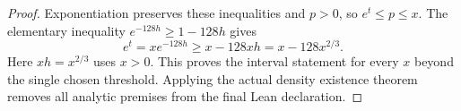 \begin{proof}
Exponentiation preserves these inequalities and $p>0$, so
$e^t\leq p\leq x$.
The elementary inequality $e^{-128h}\geq1-128h$ gives
\[
 e^t=xe^{-128h}\geq x-128xh=x-128x^{2/3}.
\]
Here $xh=x^{2/3}$ uses $x>0$.
This proves the interval statement for every $x$ beyond the single
chosen threshold.  Applying the actual density existence theorem
removes all analytic premises from the final Lean declaration.
\end{proof}
